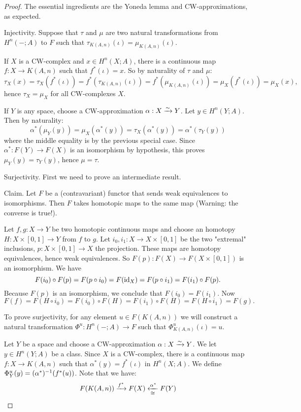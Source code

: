 \begin{proof}
The essential ingredients are the Yoneda lemma and CW-approximations, as expected.

Injectivity. Suppose that $\tau$ and $\mu$ are two natural transformations from $H^n(-;A)$ to $F$ such that $\tau_{K(A,n)}(\iota)=\mu_{K(A,n)}(\iota)$.

If $X$ is a CW-complex and $x\in H^n(X;A)$, there is a continuous map $f:X\to K(A,n)$ such that $f^*(\iota)=x$. So by naturality of $\tau$ and $\mu$:
\[\tau_X(x)=\tau_X(f^*(\iota))=f^*(\tau_{K(A,n)}(\iota))=f^*(\mu_{K(A,n)}(\iota))=\mu_X(f^*(\iota))=\mu_X(x),\]
hence $\tau_X=\mu_X$ for all CW-complexes $X$.

If $Y$ is any space, choose a CW-approximation $\alpha:X\xrightarrow{\sim} Y$. Let $y\in H^n(Y;A)$. Then by naturality:
\[\alpha^*(\mu_Y(y))=\mu_X(\alpha^*(y))=\tau_X(\alpha^*(y))=\alpha^*(\tau_Y(y))\]
where the middle equality is by the previous special case. Since $\alpha^*:F(Y)\to F(X)$ is an isomorphism by hypothesis, this proves $\mu_Y(y)=\tau_Y(y)$, hence $\mu=\tau$.

Surjectivity. First we need to prove an intermediate result.

Claim. Let $F$ be a (contravariant) functor that sends weak equivalences to isomorphisms. Then $F$ takes homotopic maps to the same map (Warning: the converse is  true!).

\begin{claimproof}
Let $f,g:X\to Y$ be two homotopic continuous maps and choose an homotopy $H:X\times[0,1]\to Y$ from $f$ to $g$. Let $i_0,i_1:X\to X\times[0,1]$ be the two "extremal" inclusions, $p:X\times[0,1]\to X$ the projection. These maps are homotopy equivalences, hence weak equivalences. So $F(p):F(X)\to F(X\times[0,1])$ is an isomorphism. We have
\[F(i_0)\circ F(p)=F(p\circ i_0)=F(\operatorname{id}_X)=F(p\circ i_1)=F(i_1)\circ F(p).\]
Because $F(p)$ is an isomorphism, we conclude that $F(i_0)=F(i_1)$. Now
\[F(f)=F(H\circ i_0)=F(i_0)\circ F(H)=F(i_1)\circ F(H)=F(H\circ i_1)=F(g).\]
\end{claimproof}

To prove surjectivity, for any element $u\in F(K(A,n))$ we will construct a natural transformation $\Phi^u:H^n(-;A)\to F$ such that $\Phi^u_{K(A,n)}(\iota)=u$.

Let $Y$ be a space and choose a CW-approximation $\alpha:X\xrightarrow{\sim}Y$. We let $y\in H^n(Y;A)$ be a class. Since $X$ is a CW-complex, there is a continuous map $f:X\to K(A,n)$ such that $\alpha^*(y)=f^*(\iota)$ in $H^n(X;A)$. We define $\Phi^u_Y(y)=(\alpha^*)^{-1}(f^*(u))$. Note that we have:
\[F(K(A,n))\xrightarrow{f^*}F(X)\underset{\cong}{\xleftarrow{\alpha^*}}F(Y)\]


\end{proof}
